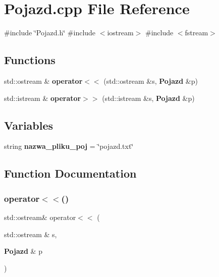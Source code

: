 \section{Pojazd.\+cpp File Reference}
\label{_pojazd_8cpp}
{\ttfamily \#include \char`\"{}Pojazd.\+h\char`\"{}}\newline
{\ttfamily \#include $<$iostream$>$}\newline
{\ttfamily \#include $<$fstream$>$}\newline
\subsection*{Functions}
\begin{DoxyCompactItemize}
\item 
std\+::ostream \& \textbf{ operator$<$$<$} (std\+::ostream \&s, \textbf{ Pojazd} \&p)
\item 
std\+::istream \& \textbf{ operator$>$$>$} (std\+::istream \&s, \textbf{ Pojazd} \&p)
\end{DoxyCompactItemize}
\subsection*{Variables}
\begin{DoxyCompactItemize}
\item 
string \textbf{ nazwa\+\_\+pliku\+\_\+poj} = \char`\"{}pojazd.\+txt\char`\"{}
\end{DoxyCompactItemize}


\subsection{Function Documentation}
\mbox{\label{_pojazd_8cpp_a3c3d50c9fa2eb85fabaf027bbaf2ffda}} 
\subsubsection{operator$<$$<$()}
{\footnotesize\ttfamily std\+::ostream\& operator$<$$<$ (\begin{DoxyParamCaption}\item[{std\+::ostream \&}]{s,  }\item[{\textbf{ Pojazd} \&}]{p }\end{DoxyParamCaption})}

\mbox{\label{_pojazd_8cpp_aa0fa6911e723f94e1326ef19bcde5cff}} 
